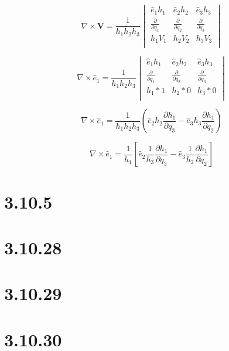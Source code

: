 \documentclass[12pt]{article}
\begin{document}
\[
    \nabla \times \textbf{V} = \frac{1}{h_1 h_2 h_3}
    \begin{vmatrix}
        \hat{e}_1 h_1                 & \hat{e}_2 h_2                 & \hat{e}_3 h_3                 \\
        \frac{\partial}{\partial q_1} & \frac{\partial}{\partial q_2} & \frac{\partial}{\partial q_3} \\
        h_1 V_1                       & h_2 V_2                       & h_3 V_3                       \\
    \end{vmatrix}
\]

\[
    \nabla \times \hat{e}_1 = \frac{1}{h_1 h_2 h_3}
    \begin{vmatrix}
        \hat{e}_1 h_1                 & \hat{e}_2 h_2                 & \hat{e}_3 h_3                 \\
        \frac{\partial}{\partial q_1} & \frac{\partial}{\partial q_2} & \frac{\partial}{\partial q_3} \\
        h_1*1                         & h_2*0                         & h_3*0                         \\
    \end{vmatrix}
\]

\[
    \nabla \times \hat{e}_1 = \frac{1}{h_1 h_2 h_3}\left(\hat{e}_2 h_2 \frac{\partial h_1}{\partial q_3} - \hat{e}_3 h_3 \frac{\partial h_1}{\partial q_2} \right)
\]

\[
    \nabla \times \hat{e}_1 = \frac{1}{h_1}\left[\hat{e}_2 \frac{1}{h_3} \frac{\partial h_1}{\partial q_3} - \hat{e}_3  \frac{1}{h_2}  \frac{\partial h_1}{\partial q_2} \right]
\]

\section{3.10.5}

\section{3.10.28}

\section{3.10.29}

\section{3.10.30}
\end{document}
